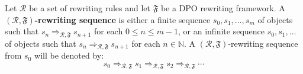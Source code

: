 \begin{definition}
    Let \(\mathcal{R}\) be a set of rewriting rules and let $\mathfrak{F}$ be a DPO rewriting framework.
    A \textbf{$(\mathcal{R},\mathfrak{F})$-rewriting sequence} is either a finite sequence \(s_0,s_1,\hdots, s_m\) of objects such that \(s_n \Rightarrow_{\mathcal{R},\mathfrak{F}} s_{n+1}\) for each \( 0 \leq n \leq m-1\), or an infinite sequence \(s_0,s_1,\hdots\) of objects such that \(s_n \Rightarrow_{\mathcal{R},\mathfrak{F}} s_{n+1}\) for each \(n \in \mathbb{N}\).
    A $(\mathcal{R},\mathfrak{F})$-rewriting sequence from \( s_0 \) will be denoted by:
    \[
    s_0 \Rightarrow_{\mathcal{R},\mathfrak{F}} s_1 \Rightarrow_{\mathcal{R},\mathfrak{F}} s_2 \Rightarrow_{\mathcal{R},\mathfrak{F}} \cdots 
    \]
\end{definition}

